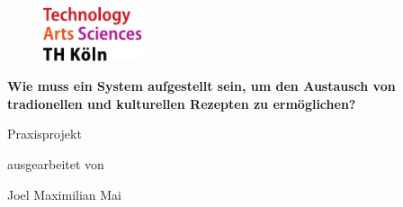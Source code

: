 \begin{titlepage}

\begin{center}

\begin{figure}[!ht]
		\includegraphics[width=0.26\textwidth]{images/THlogoheader.pdf}
\end{figure}

\vspace{0.4cm}

\begin{rmfamily}
\begin{huge}
\textbf{Wie muss ein System aufgestellt sein, um den Austausch von tradionellen und kulturellen Rezepten zu ermöglichen?}\\	
\end{huge}
\end{rmfamily}

\vspace{0.8cm}



\begin{LARGE}
\begin{scshape}
Praxisprojekt\\[0.8em]
\end{scshape}
\end{LARGE}

\begin{large}
ausgearbeitet von\\ 
\vspace{0.3cm}
\begin{LARGE}
Joel Maximilian Mai\\
\end{LARGE}
\end{large}


\end{center}
\end{titlepage}
